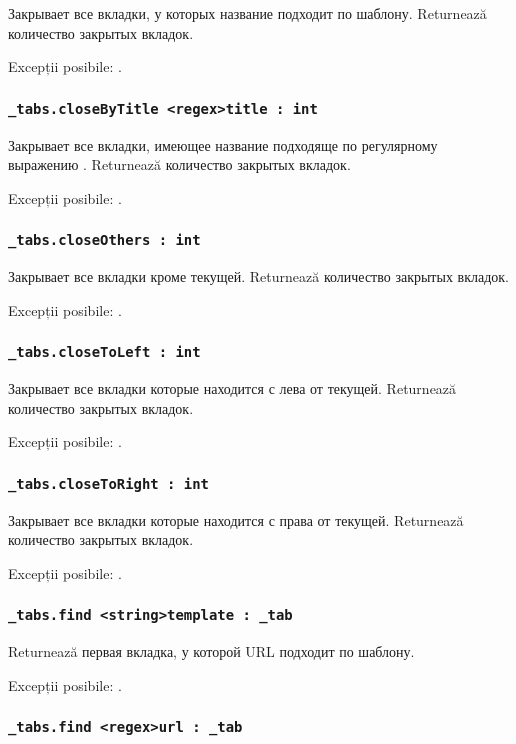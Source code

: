 Закрывает все вкладки, у которых название подходит по шаблону. Returnează количество закрытых вкладок.

Excepții posibile: .

\subsubsection{\lstinline|_tabs.closeByTitle <regex>title : int|}

Закрывает все вкладки, имеющее название подходяще по регулярному выражению . Returnează количество закрытых вкладок.

Excepții posibile: .

\subsubsection{\lstinline|_tabs.closeOthers : int|}

Закрывает все вкладки кроме текущей. Returnează количество закрытых вкладок.

Excepții posibile: .

\subsubsection{\lstinline|_tabs.closeToLeft : int|}

Закрывает все вкладки которые находится с лева от текущей. Returnează количество закрытых вкладок.

Excepții posibile: .

\subsubsection{\lstinline|_tabs.closeToRight : int|}

Закрывает все вкладки которые находится с права от текущей. Returnează количество закрытых вкладок.

Excepții posibile: .

\subsubsection{\lstinline|_tabs.find <string>template : _tab|}

Returnează первая вкладка, у которой URL подходит по шаблону.

Excepții posibile: .

\subsubsection{\lstinline|_tabs.find <regex>url : _tab|}

